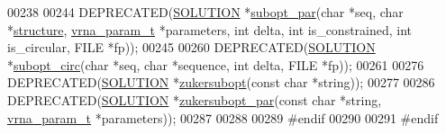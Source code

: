 \begin{DoxyCode}
00238 
00244 DEPRECATED(\hyperlink{structvrna__subopt__sol__s}{SOLUTION} *\hyperlink{group__subopt__wuchty_gaa1e1e7031a948ebcb39a9d58d1e9842c}{subopt\_par}(\textcolor{keywordtype}{char} *seq, \textcolor{keywordtype}{char} *\hyperlink{structvrna__subopt__sol__s_a3c632c7f08eb6a8827c6151625e5ef8e}{structure}, 
      \hyperlink{group__energy__parameters_structvrna__param__s}{vrna\_param\_t} *parameters, \textcolor{keywordtype}{int} delta, \textcolor{keywordtype}{int} is\_constrained, \textcolor{keywordtype}{int} is\_circular, FILE *fp));
00245 
00260 DEPRECATED(\hyperlink{structvrna__subopt__sol__s}{SOLUTION} *\hyperlink{group__subopt__wuchty_ga8634516e4740e0b6c9a46d2bae940340}{subopt\_circ}(\textcolor{keywordtype}{char} *seq, \textcolor{keywordtype}{char} *sequence, \textcolor{keywordtype}{int} delta, FILE *fp));
00261 
00276 DEPRECATED(\hyperlink{structvrna__subopt__sol__s}{SOLUTION}  *\hyperlink{group__subopt__zuker_ga0d5104e3ecf119d8eabd40aa5fe47f90}{zukersubopt}(\textcolor{keyword}{const} \textcolor{keywordtype}{char} *\textcolor{keywordtype}{string}));
00277 
00286 DEPRECATED(\hyperlink{structvrna__subopt__sol__s}{SOLUTION}  *\hyperlink{group__subopt__zuker_gab6d0ea8cc1d02f6dd831ca81043c9eb8}{zukersubopt\_par}(\textcolor{keyword}{const} \textcolor{keywordtype}{char} *\textcolor{keywordtype}{string}, 
      \hyperlink{group__energy__parameters_structvrna__param__s}{vrna\_param\_t} *parameters));
00287 
00288 
00289 \textcolor{preprocessor}{#endif}
00290 
00291 \textcolor{preprocessor}{#endif}
\end{DoxyCode}
